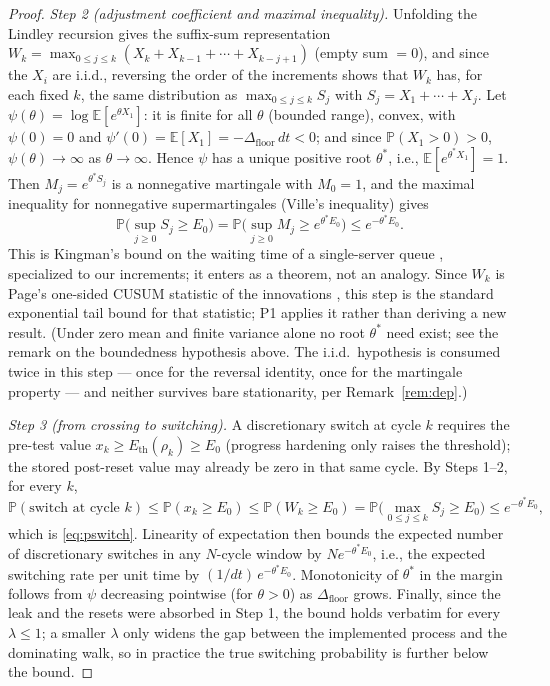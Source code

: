 \documentclass[11pt]{article}
\newcommand{\Dfloor}{\Delta_{\text{floor}}}
\newcommand{\Eth}{E_{\text{th}}}
\begin{document}
\begin{proof}
\emph{Step 2 (adjustment coefficient and maximal inequality).} Unfolding the Lindley recursion gives the suffix-sum representation $W_k = \max_{0 \le j \le k} (X_k + X_{k-1} + \cdots + X_{k-j+1})$ (empty sum $= 0$), and since the $X_i$ are i.i.d., reversing the order of the increments shows that $W_k$ has, for each fixed $k$, the same distribution as $\max_{0 \le j \le k} S_j$ with $S_j = X_1 + \cdots + X_j$. Let $\psi(\theta) = \log \mathbb{E}[e^{\theta X_1}]$: it is finite for all $\theta$ (bounded range), convex, with $\psi(0) = 0$ and $\psi'(0) = \mathbb{E}[X_1] = -\Dfloor\,dt < 0$; and since $\mathbb{P}(X_1 > 0) > 0$, $\psi(\theta) \to \infty$ as $\theta \to \infty$. Hence $\psi$ has a unique positive root $\theta^*$, i.e., $\mathbb{E}[e^{\theta^* X_1}] = 1$. Then $M_j = e^{\theta^* S_j}$ is a nonnegative martingale with $M_0 = 1$, and the maximal inequality for nonnegative supermartingales (Ville's inequality) gives
\[
\mathbb{P}\Big(\sup_{j \ge 0} S_j \ge E_0\Big) = \mathbb{P}\Big(\sup_{j \ge 0} M_j \ge e^{\theta^* E_0}\Big) \le e^{-\theta^* E_0}.
\]
This is Kingman's bound on the waiting time of a single-server queue \cite{kingman1970queues}, specialized to our increments; it enters as a theorem, not an analogy. Since $W_k$ is Page's one-sided CUSUM statistic of the innovations \cite{page1954cusum}, this step is the standard exponential tail bound for that statistic; P1 applies it rather than deriving a new result. (Under zero mean and finite variance alone no root $\theta^*$ need exist; see the remark on the boundedness hypothesis above. The i.i.d.\ hypothesis is consumed twice in this step --- once for the reversal identity, once for the martingale property --- and neither survives bare stationarity, per Remark~\ref{rem:dep}.)

\emph{Step 3 (from crossing to switching).} A discretionary switch at cycle $k$ requires the pre-test value $x_k \ge \Eth(\rho_k) \ge E_0$ (progress hardening only raises the threshold); the stored post-reset value may already be zero in that same cycle. By Steps 1--2, for every $k$,
\[
\mathbb{P}(\text{switch at cycle } k) \le \mathbb{P}(x_k \ge E_0) \le \mathbb{P}(W_k \ge E_0) = \mathbb{P}\Big(\max_{0 \le j \le k} S_j \ge E_0\Big) \le e^{-\theta^* E_0},
\]
which is \eqref{eq:pswitch}. Linearity of expectation then bounds the expected number of discretionary switches in any $N$-cycle window by $N e^{-\theta^* E_0}$, i.e., the expected switching rate per unit time by $(1/dt)\, e^{-\theta^* E_0}$. Monotonicity of $\theta^*$ in the margin follows from $\psi$ decreasing pointwise (for $\theta > 0$) as $\Dfloor$ grows. Finally, since the leak and the resets were absorbed in Step 1, the bound holds verbatim for every $\lambda \le 1$; a smaller $\lambda$ only widens the gap between the implemented process and the dominating walk, so in practice the true switching probability is further below the bound.


\end{proof}
\end{document}
